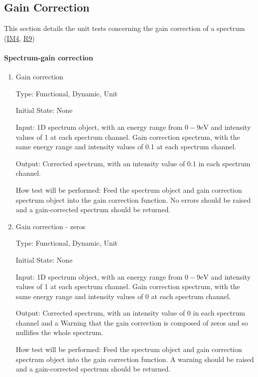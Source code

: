 \documentclass[12pt, titlepage]{article}
\begin{document}
\subsection{Gain Correction}
This section details the unit tests concerning the gain correction of a spectrum
(\hyperref[gain]{IM4}, \hyperref[R_gain]{R9})

\paragraph{Spectrum-gain correction}

\begin{enumerate}

\item{Gain correction}

Type: Functional, Dynamic, Unit

Initial State: None

Input: 1D spectrum object, with an energy range from $0-9 \si{\electronvolt}$
and intensity values of 1 at each spectrum channel. Gain correction spectrum,
with the same energy range and intensity values of 0.1 at each spectrum channel.

Output: Corrected spectrum, with an intensity value of 0.1 in each spectrum
channel.

How test will be performed: Feed the spectrum object and gain correction
spectrum object into the gain correction function. No errors should be raised
and a gain-corrected spectrum should be returned.


\item{Gain correction - zeros}

Type: Functional, Dynamic, Unit

Initial State: None

Input: 1D spectrum object, with an energy range from $0-9 \si{\electronvolt}$
and intensity values of 1 at each spectrum channel. Gain correction spectrum,
with the same energy range and intensity values of 0 at each spectrum channel.

Output: Corrected spectrum, with an intensity value of 0 in each spectrum
channel and a Warning that the gain correction is composed of zeros and so
nullifies the whole spectrum.

How test will be performed: Feed the spectrum object and gain correction
spectrum object into the gain correction function. A warning should be raised
and a gain-corrected spectrum should be returned.

\end{enumerate}
\end{document}
